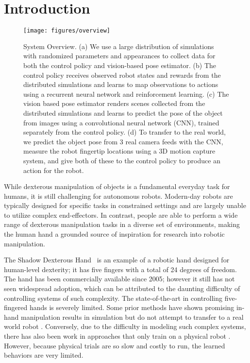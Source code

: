 \section{Introduction}

\begin{figure}\centering
    \texttt{[image: figures/overview]}
    \caption{
        System Overview. (a) We use a large distribution of simulations with randomized parameters and appearances to collect data for both the control policy and vision-based pose estimator. (b) The control policy receives observed robot states and rewards from the distributed simulations and learns to map observations to actions using a recurrent neural network and reinforcement learning. (c) The vision based pose estimator renders scenes collected from the distributed simulations and learns to predict the pose of the object from images using a convolutional neural network (CNN), trained separately from the control policy. (d) To transfer to the real world, we predict the object pose from 3 real camera feeds with the CNN, measure the robot fingertip locations using a 3D motion capture system, and give both of these to the control policy to produce an action for the robot.
    }
    \label{fig:overview}
\end{figure}


While dexterous manipulation of objects is a fundamental everyday task for humans,
it is still challenging for autonomous robots.
Modern-day robots are typically designed for specific tasks in constrained settings and are largely unable to utilize complex end-effectors.
In contrast, people are able to perform a wide range of dexterous manipulation tasks in a diverse set of environments, making the human hand a grounded source of inspiration for research into robotic manipulation.

The Shadow Dexterous Hand~\citep{shadow-robot} is an example of a robotic hand designed for human-level dexterity; it has five fingers with a total of \num{24} degrees of freedom.
The hand has been commercially available since 2005; however it still has not seen widespread adoption, which can be attributed to the daunting difficulty of controlling systems of such complexity.
The state-of-the-art in controlling five-fingered hands is severely limited.
Some prior methods have shown promising in-hand manipulation results in simulation but do not attempt to transfer to a real world robot \citep{DBLP:conf/icra/BaiL14, DBLP:conf/sca/MordatchPT12}.
Conversely, due to the difficulty in modeling such complex systems, there has also been work in approaches that only train on a physical robot \citep{falco2018policy, DBLP:conf/humanoids/HoofHN015, DBLP:journals/corr/KumarGTL16, DBLP:conf/icra/KumarTL16}.
However, because physical trials are so slow and costly to run, the learned behaviors are very limited.

